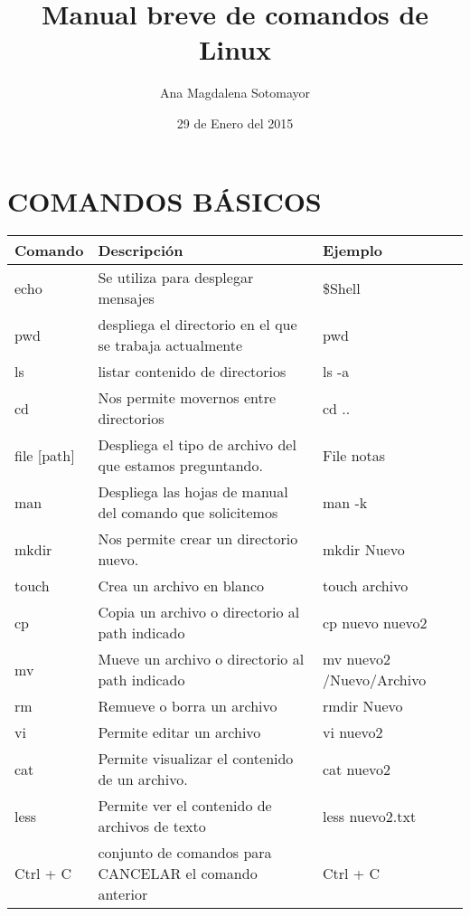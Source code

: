 \documentclass[letterpaper,10pt,twoside,onecolumn]{article}
\title{Manual breve de comandos de Linux}
\author{Ana Magdalena Sotomayor}
\date{29 de Enero del 2015}
\begin{document}
\maketitle

\section{COMANDOS B\'ASICOS}

\begin{tabular}{|p{2.0cm}|p{6.0cm}|p{4.0cm}|}
\hline
Comando & Descripción & Ejemplo \\
\hline
echo & Se utiliza para desplegar mensajes & \$Shell \\ \hline
pwd & despliega el directorio en el que se trabaja actualmente & pwd
\\ \hline
ls & listar contenido de directorios & ls -a \\ \hline
cd & Nos permite movernos entre directorios & cd .. \\ \hline
file [path]	 &Despliega el tipo de archivo del que estamos preguntando. & File notas
\\ \hline
man &Despliega las hojas de manual del comando que solicitemos & man -k
\\ \hline
mkdir & Nos permite crear un directorio nuevo.& mkdir Nuevo \\ \hline
touch & Crea un archivo en blanco & touch archivo \\ \hline
cp & Copia un archivo  o directorio al path indicado & cp nuevo nuevo2 \\ \hline
mv & Mueve un archivo o directorio al path indicado & mv nuevo2 /Nuevo/Archivo \\ \hline
rm & Remueve o borra un archivo & rmdir Nuevo\\ \hline
vi & Permite editar un archivo & vi nuevo2 \\ \hline
cat & Permite visualizar el contenido de un archivo. & cat nuevo2 \\ \hline
less & Permite ver el contenido de archivos de texto & less nuevo2.txt \\ \hline
Ctrl + C & conjunto de comandos para CANCELAR el comando anterior  & Ctrl + C\\
\hline
\end{tabular} 

\end{document}
